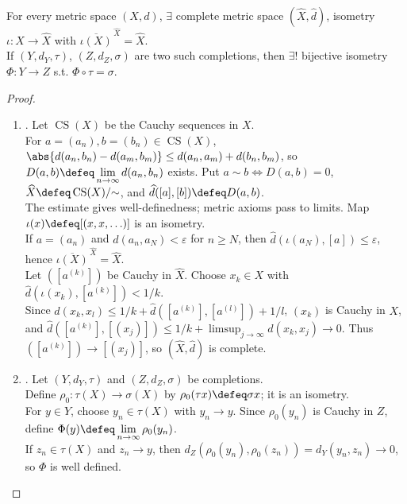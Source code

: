 \begin{theorem} \label{thm:metric-completion-existence-uniqueness} \\
For every metric space $(X,d)$, $\exists$ complete metric space $(\widehat{X},\widehat{d})$, isometry $\iota:X\to\widehat{X}$ with $\overline{\iota(X)}^{\,\widehat{X}}=\widehat{X}$.\\
If $(Y,d_Y,\tau)$, $(Z,d_Z,\sigma)$ are two such completions, then $\exists!$ bijective isometry $\Phi:Y\to Z$ s.t. $\Phi\circ\tau=\sigma$.
\begin{proof}
\begin{enumerate}[label=\roman*.]
\setlength{\itemsep}{0pt}
\item {}. Let $\operatorname{CS}(X)$ be the Cauchy sequences in $X$.\\
For $a=(a_n),b=(b_n)\in\operatorname{CS}(X)$, $\abs{d(a_n,b_n)-d(a_m,b_m)}\leq d(a_n,a_m)+d(b_n,b_m)$, so $D(a,b)\defeq\lim\limits_{n\to\infty} d(a_n,b_n)$ exists. Put $a\sim b\Leftrightarrow D(a,b)=0$, $\widehat{X}\defeq\operatorname{CS}(X)/{\sim}$, and $\widehat{d}([a],[b])\defeq D(a,b)$.\\
The estimate gives well-definedness; metric axioms pass to limits. Map $\iota(x)\defeq[(x,x,\ldots)]$ is an isometry.\\
If $a=(a_n)$ and $d(a_n,a_N)<\varepsilon$ for $n\geq N$, then $\widehat{d}(\iota(a_N),[a])\leq\varepsilon$, hence $\overline{\iota(X)}^{\,\widehat{X}}=\widehat{X}$.\\
Let $([a^{(k)}])$ be Cauchy in $\widehat{X}$. Choose $x_k\in X$ with $\widehat{d}(\iota(x_k),[a^{(k)}])<1/k$.\\
Since $d(x_k,x_l)\leq1/k+\widehat{d}([a^{(k)}],[a^{(l)}])+1/l$, $(x_k)$ is Cauchy in $X$,\\
and $\widehat{d}([a^{(k)}],[(x_j)])\leq1/k+\limsup_{j\to\infty}d(x_k,x_j)\to0$. Thus $([a^{(k)}])\to[(x_j)]$, so $(\widehat{X},\widehat{d})$ is complete.
\item {}. Let $(Y,d_Y,\tau)$ and $(Z,d_Z,\sigma)$ be completions.\\
Define $\rho_0:\tau(X)\to\sigma(X)$ by $\rho_0(\tau x)\defeq\sigma x$; it is an isometry.\\
For $y\in Y$, choose $y_n\in\tau(X)$ with $y_n\to y$. Since $\rho_0(y_n)$ is Cauchy in $Z$, define $\Phi(y)\defeq\lim\limits_{n\to\infty}\rho_0(y_n)$.\\
If $z_n\in\tau(X)$ and $z_n\to y$, then $d_Z(\rho_0(y_n),\rho_0(z_n))=d_Y(y_n,z_n)\to0$, so $\Phi$ is well defined.\\

\end{enumerate}
\end{proof}
\end{theorem}
